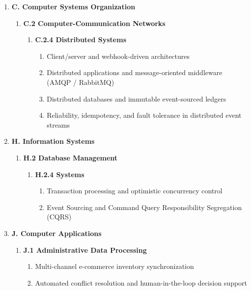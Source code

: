 \documentclass[oneside,a4paper,12pt]{report}
\begin{document}
\begin{enumerate}
  \item \textbf{C. Computer Systems Organization}
  \begin{enumerate}
    \item \textbf{C.2 Computer-Communication Networks}
    \begin{enumerate}
      \item \textbf{C.2.4 Distributed Systems}
      \begin{enumerate}
        \item Client/server and webhook-driven architectures
        \item Distributed applications and message-oriented middleware (AMQP / RabbitMQ)
        \item Distributed databases and immutable event-sourced ledgers
        \item Reliability, idempotency, and fault tolerance in distributed event streams
      \end{enumerate}
    \end{enumerate}
  \end{enumerate}
  \item \textbf{H. Information Systems}
  \begin{enumerate}
    \item \textbf{H.2 Database Management}
    \begin{enumerate}
      \item \textbf{H.2.4 Systems}
      \begin{enumerate}
        \item Transaction processing and optimistic concurrency control
        \item Event Sourcing and Command Query Responsibility Segregation (CQRS)
      \end{enumerate}
    \end{enumerate}
  \end{enumerate}
  \item \textbf{J. Computer Applications}
  \begin{enumerate}
    \item \textbf{J.1 Administrative Data Processing}
    \begin{enumerate}
      \item Multi-channel e-commerce inventory synchronization
      \item Automated conflict resolution and human-in-the-loop decision support
    \end{enumerate}
  \end{enumerate}
\end{enumerate}
\end{document}
